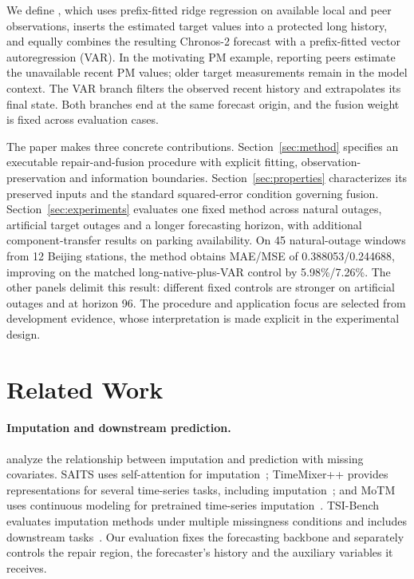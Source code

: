 We define \method{}, which uses prefix-fitted ridge regression on available local and peer observations, inserts the estimated target values into a protected long history, and equally combines the resulting Chronos-2 forecast with a prefix-fitted vector autoregression (VAR). In the motivating PM example, reporting peers estimate the unavailable recent PM values; older target measurements remain in the model context. The VAR branch filters the observed recent history and extrapolates its final state. Both branches end at the same forecast origin, and the fusion weight is fixed across evaluation cases.

The paper makes three concrete contributions. Section~\ref{sec:method} specifies an executable repair-and-fusion procedure with explicit fitting, observation-preservation and information boundaries. Section~\ref{sec:properties} characterizes its preserved inputs and the standard squared-error condition governing fusion. Section~\ref{sec:experiments} evaluates one fixed method across natural outages, artificial target outages and a longer forecasting horizon, with additional component-transfer results on parking availability. On 45 natural-outage windows from 12 Beijing stations, the method obtains MAE/MSE of 0.388053/0.244688, improving on the matched long-native-plus-VAR control by 5.98\%/7.26\%. The other panels delimit this result: different fixed controls are stronger on artificial outages and at horizon 96. The procedure and application focus are selected from development evidence, whose interpretation is made explicit in the experimental design.

\section{Related Work}
\label{sec:related}

\paragraph{Imputation and downstream prediction.}
\citet{lemorvan2021good} analyze the relationship between imputation and prediction with missing covariates. SAITS uses self-attention for imputation~\citep{du2023saits}; TimeMixer++ provides representations for several time-series tasks, including imputation~\citep{wang2025timemixerpp}; and MoTM uses continuous modeling for pretrained time-series imputation~\citep{motmsoftware}. TSI-Bench evaluates imputation methods under multiple missingness conditions and includes downstream tasks~\citep{du2024tsibench}. Our evaluation fixes the forecasting backbone and separately controls the repair region, the forecaster's history and the auxiliary variables it receives.

